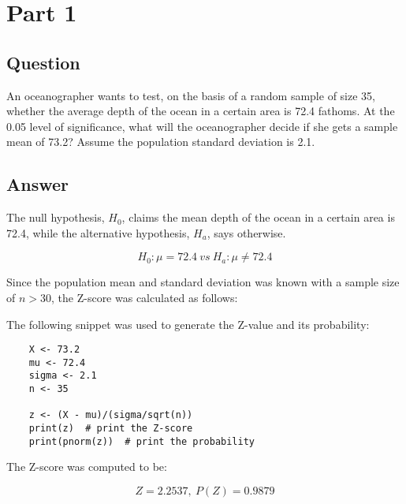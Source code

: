 \section{Part 1}
    \subsection{Question}
    An oceanographer wants to test, on the basis of a random sample of size 35, whether the average depth of the ocean in a certain area is 72.4 fathoms. At the 0.05 level of significance, what will the oceanographer decide if she gets a sample mean of 73.2? Assume the population standard deviation is 2.1.

    \subsection{Answer}
    The null hypothesis, $H_{0}$, claims the mean depth of the ocean in a certain area is 72.4, while the alternative hypothesis, $H_{a}$, says otherwise.

        \[ H_{0}: \mu = 72.4 \ vs \ H_{a}: \mu \neq 72.4 \]

    Since the population mean and standard deviation was known with a sample size of $n > 30$, the Z-score was calculated as follows:

        

    The following snippet was used to generate the Z-value and its probability:
\begin{lstlisting}
    X <- 73.2
    mu <- 72.4
    sigma <- 2.1
    n <- 35

    z <- (X - mu)/(sigma/sqrt(n))
    print(z)  # print the Z-score
    print(pnorm(z))  # print the probability
\end{lstlisting}

    The Z-score was computed to be:

        \[ Z=2.2537, \ P(Z) =0.9879 \]
